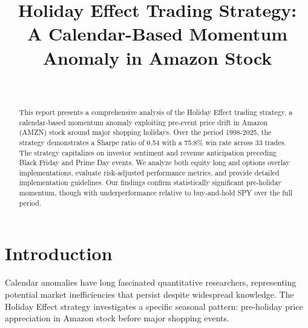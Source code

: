 \documentclass[twocolumn,ieee]{arithmaxresearch}
\begin{document}
\onecolumn

\title{Holiday Effect Trading Strategy: \\
A Calendar-Based Momentum Anomaly in Amazon Stock}

\author{
\\
\vspace{0.5em}
}

\maketitle

\begin{center}
\vspace{1em}
\arithmaxlogoscaled[5cm]
\end{center}

\vspace{2em}

\twocolumn

\begin{abstract}
This report presents a comprehensive analysis of the Holiday Effect trading strategy, a calendar-based momentum anomaly exploiting pre-event price drift in Amazon (AMZN) stock around major shopping holidays. Over the period 1998-2025, the strategy demonstrates a Sharpe ratio of 0.54 with a 75.8\% win rate across 33 trades. The strategy capitalizes on investor sentiment and revenue anticipation preceding Black Friday and Prime Day events. We analyze both equity long and options overlay implementations, evaluate risk-adjusted performance metrics, and provide detailed implementation guidelines. Our findings confirm statistically significant pre-holiday momentum, though with underperformance relative to buy-and-hold SPY over the full period.
\end{abstract}

\section{Introduction}

Calendar anomalies have long fascinated quantitative researchers, representing potential market inefficiencies that persist despite widespread knowledge. The Holiday Effect strategy investigates a specific seasonal pattern: pre-holiday price appreciation in Amazon stock before major shopping events.
\end{document}
